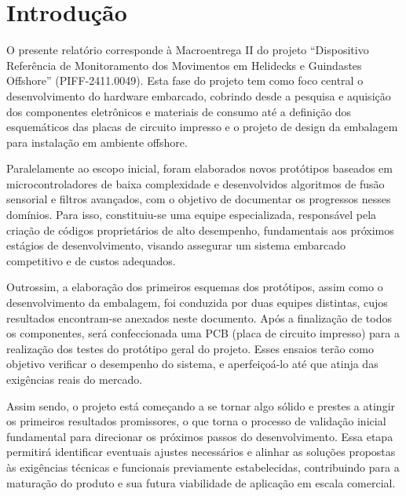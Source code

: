 \documentclass[a4paper, 12pt]{article}
\makeatletter
\renewcommand\tableofcontents{%
    \centering
    \section*{\contentsname
        \@mkboth{%
           \MakeUppercase\contentsname}{\MakeUppercase\contentsname}}%
    \@starttoc{toc}%
    }
\makeatother
\begin{document}

\pagestyle{modeloTexto}


\newpage
\tableofcontents
\newpage
\listoffigures
\newpage
\listoftables
\newpage
\raggedright
\justifying
\normalsize


\newpage
\section{Introdução}
    O presente relatório corresponde à Macroentrega II do projeto “Dispositivo Referência de Monitoramento dos Movimentos em Helidecks e Guindastes Offshore” (PIFF-2411.0049). Esta fase do projeto tem como foco central o desenvolvimento do hardware embarcado, cobrindo desde a pesquisa e aquisição dos componentes eletrônicos e materiais de consumo até a definição dos esquemáticos das placas de circuito impresso e o projeto de design da embalagem para instalação em ambiente offshore.

    Paralelamente ao escopo inicial, foram elaborados novos protótipos baseados em microcontroladores de baixa complexidade e desenvolvidos algoritmos de fusão sensorial e filtros avançados, com o objetivo de documentar os progressos nesses domínios. Para isso, constituiu-se uma equipe especializada, responsável pela criação de códigos proprietários de alto desempenho, fundamentais aos próximos estágios de desenvolvimento, visando assegurar um sistema embarcado competitivo e de custos adequados.
    
    Outrossim, a elaboração dos primeiros esquemas dos protótipos, assim como o desenvolvimento da embalagem, foi conduzida por duas equipes distintas, cujos resultados encontram-se anexados neste documento. Após a finalização de todos os componentes, será confeccionada uma PCB (placa de circuito impresso) para a realização dos testes do protótipo geral do projeto. Esses ensaios terão como objetivo verificar o desempenho do sistema, e aperfeiçoá-lo até que atinja das exigências reais do mercado.

    Assim sendo, o projeto está começando a se tornar algo sólido e prestes a atingir os primeiros resultados promissores, o que torna o processo de validação inicial fundamental para direcionar os próximos passos do desenvolvimento. Essa etapa permitirá identificar eventuais ajustes necessários e alinhar as soluções propostas às exigências técnicas e funcionais previamente estabelecidas, contribuindo para a maturação do produto e sua futura viabilidade de aplicação em escala comercial. 
    
\end{document}
